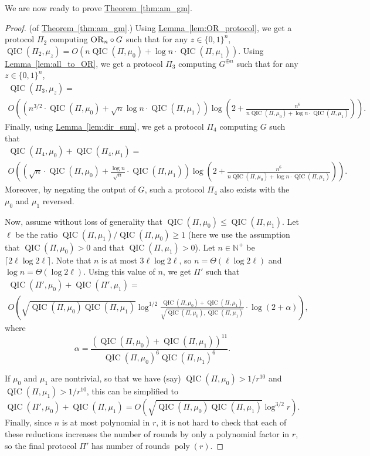 \documentclass[10pt,a4paper]{article}
\theoremstyle{definition}
\newcommand{\thm}[1]{\hyperref[thm:#1]{Theorem~\ref*{thm:#1}}}
\newcommand{\lem}[1]{\hyperref[lem:#1]{Lemma~\ref*{lem:#1}}}
\DeclareMathOperator{\poly}{poly}
\newcommand{\B}{\{0,1\}}
\renewcommand{\>}{\rangle}
\newcommand{\<}{\langle}
\newcommand{\OR}{\textsc{OR}}
\DeclareMathOperator{\QIC}{QIC}
\begin{document}
We are now ready to prove \thm{am_gm}.

\begin{proof} (of \thm{am_gm}.)
Using \lem{OR_protocol}, we get a protocol $\Pi_2$
computing $\OR_n\circ G$ such that for any $z\in\B^n$,
$\QIC(\Pi_2,\mu_z)=O(n\QIC(\Pi,\mu_0)+\log n\cdot\QIC(\Pi,\mu_1))$.
Using \lem{all_to_OR}, we get a protocol $\Pi_3$
computing $G^{\oplus n}$ such that for any $z\in\B^n$,
\begin{multline*}
\QIC(\Pi_3,\mu_z)=\\
O\left((n^{3/2}\cdot\QIC(\Pi,\mu_0)+
\sqrt{n}\log n\cdot\QIC(\Pi,\mu_1))\log\left(2+\frac{n^6}
{n\QIC(\Pi,\mu_0)+\log n\cdot\QIC(\Pi,\mu_1)}\right)\right).
\end{multline*}
Finally, using \lem{dir_sum}, we get a protocol $\Pi_4$
computing $G$ such that
\begin{multline*}
\QIC(\Pi_4,\mu_0)+\QIC(\Pi_4,\mu_1)=\\
O\left(\left(\sqrt{n}\cdot\QIC(\Pi,\mu_0)+
\frac{\log n}{\sqrt{n}}\cdot\QIC(\Pi,\mu_1)\right)
\log\left(2+\frac{n^6}
{n\QIC(\Pi,\mu_0)+\log n\cdot\QIC(\Pi,\mu_1)}\right)\right).
\end{multline*}
Moreover, by negating the output of $G$, such a protocol
$\Pi_4$ also exists with the $\mu_0$ and $\mu_1$ reversed.

Now, assume without loss of generality that
$\QIC(\Pi,\mu_0)\le\QIC(\Pi,\mu_1)$.
Let $\ell$ be the ratio $\QIC(\Pi,\mu_1)/\QIC(\Pi,\mu_0)\ge 1$
(here we use the assumption that $\QIC(\Pi,\mu_0)>0$
and that $\QIC(\Pi,\mu_1)>0$).
Let $n\in\mathbb{N}^+$ be $\lceil2\ell\log2\ell\rceil$. Note that $n$
is at most $3\ell\log 2\ell$, so $n=\Theta(\ell\log 2\ell)$
and $\log n=\Theta(\log 2\ell)$. Using this value of $n$,
we get $\Pi'$ such that
\begin{multline*}
\QIC(\Pi',\mu_0)+\QIC(\Pi',\mu_1)=\\
O\left(\sqrt{\QIC(\Pi,\mu_0)\QIC(\Pi,\mu_1)}\log^{1/2}
\frac{\QIC(\Pi,\mu_0)+\QIC(\Pi,\mu_1)}
    {\sqrt{\QIC(\Pi,\mu_0),\QIC(\Pi,\mu_1)}}
    \cdot\log(2+\alpha)\right),
\end{multline*}
where 
\[\alpha=\frac{(\QIC(\Pi,\mu_0)+\QIC(\Pi,\mu_1))^{11}}
    {\QIC(\Pi,\mu_0)^6\QIC(\Pi,\mu_1)^6}.\]

If $\mu_0$ and $\mu_1$ are nontrivial, so that we have (say)
$\QIC(\Pi,\mu_0)>1/r^{10}$ and $\QIC(\Pi,\mu_1)>1/r^{10}$,
this can be simplified to
\[\QIC(\Pi',\mu_0)+\QIC(\Pi,\mu_1)
=O(\sqrt{\QIC(\Pi,\mu_0)\QIC(\Pi,\mu_1)}\log^{3/2} r).\]
Finally, since $n$ is at most polynomial in $r$, it is not
hard to check that each of these reductions increases the number
of rounds by only a polynomial factor in $r$, so the final
protocol $\Pi'$ has number of rounds $\poly(r)$.
\end{proof}
\end{document}
